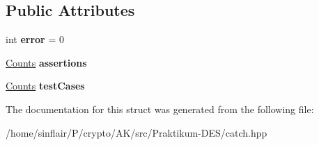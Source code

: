 \subsection*{Public Attributes}
\begin{DoxyCompactItemize}
\item 
\mbox{\label{structCatch_1_1Totals_a6ea14c7de7ea735a14f172a26e08a239}} 
int {\bfseries error} = 0
\item 
\mbox{\label{structCatch_1_1Totals_a885ded66df752147b30c3d45aa602ec9}} 
\hyperlink{structCatch_1_1Counts}{Counts} {\bfseries assertions}
\item 
\mbox{\label{structCatch_1_1Totals_adb195fe477aedee2ecea88c888f16506}} 
\hyperlink{structCatch_1_1Counts}{Counts} {\bfseries test\+Cases}
\end{DoxyCompactItemize}


The documentation for this struct was generated from the following file\+:\begin{DoxyCompactItemize}
\item 
/home/sinflair/\+P/crypto/\+A\+K/src/\+Praktikum-\/\+D\+E\+S/catch.\+hpp\end{DoxyCompactItemize}
